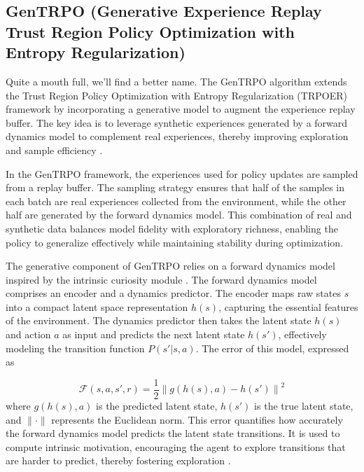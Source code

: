 \documentclass{svproc}
\begin{document}
\subsection{GenTRPO (Generative Experience Replay Trust Region Policy Optimization with Entropy Regularization)}

Quite a mouth full, we'll find a better name. The GenTRPO algorithm extends the Trust Region Policy Optimization with Entropy Regularization (TRPOER) framework \cite{schulman2017proximalpolicyoptimizationalgorithms,schulman2017trustregionpolicyoptimization} by incorporating a generative model to augment the experience replay buffer. The key idea is to leverage synthetic experiences generated by a forward dynamics model to complement real experiences, thereby improving exploration and sample efficiency \cite{pathak2017curiositydrivenexplorationselfsupervisedprediction}. 

In the GenTRPO framework, the experiences used for policy updates are sampled from a replay buffer. The sampling strategy ensures that half of the samples in each batch are real experiences collected from the environment, while the other half are generated by the forward dynamics model. This combination of real and synthetic data balances model fidelity with exploratory richness, enabling the policy to generalize effectively while maintaining stability during optimization.

The generative component of GenTRPO relies on a forward dynamics model inspired by the intrinsic curiosity module \cite{pathak2017curiositydrivenexplorationselfsupervisedprediction}. The forward dynamics model comprises an encoder and a dynamics predictor. The encoder maps raw states \( s \) into a compact latent space representation \( h(s) \), capturing the essential features of the environment. The dynamics predictor then takes the latent state \( h(s) \) and action \( a \) as input and predicts the next latent state \( h(s') \), effectively modeling the transition function \( P(s' | s, a) \). The error of this model, expressed as 

\begin{equation}
  \mathcal{F}(s, a, s', r) = \frac{1}{2} \left\| g(h(s), a) - h(s') \right\|^2
\end{equation}
\noindent
where \( g(h(s), a) \) is the predicted latent state, \( h(s') \) is the true latent state, and \( \| \cdot \| \) represents the Euclidean norm. This error quantifies how accurately the forward dynamics model predicts the latent state transitions. It is used to compute intrinsic motivation, encouraging the agent to explore transitions that are harder to predict, thereby fostering exploration  \cite{wang2024prioritizedgenerativereplay}.
\end{document}
